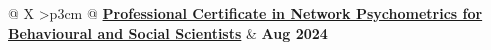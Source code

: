 \documentclass[a4paper,12pt]{article}
\begin{document}
\begin{tabularx}{\linewidth}{@{} X >{\raggedleft\arraybackslash}p{3cm} @{}}
    \href{https://credentials.nus.edu.sg/ecab0868-7c14-4cae-a6a6-1f34352337eb}{\textbf{Professional Certificate in Network Psychometrics for Behavioural and \newline Social Scientists}} & \textbf{Aug 2024} \\
     \\[3.75pt]
\end{tabularx}

\vfill
{}
\end{document}
